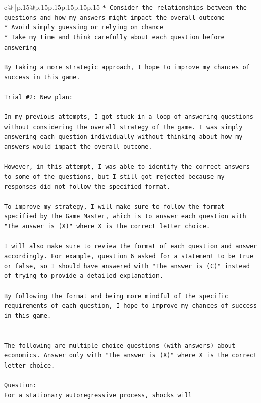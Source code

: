 \documentclass{article}
\begin{document}
{\begin{supertabular}{c@{$\;$}|p{.15\linewidth}@{}p{.15\linewidth}p{.15\linewidth}p{.15\linewidth}p{.15\linewidth}p{.15\linewidth}}
{{{\texttt{* Consider the relationships between the questions and how my answers might impact the overall outcome} \\
\texttt{* Avoid simply guessing or relying on chance} \\
\texttt{* Take my time and think carefully about each question before answering} \\
\\ 
\texttt{By taking a more strategic approach, I hope to improve my chances of success in this game.} \\
\\ 
\texttt{Trial \#2: New plan: } \\
\\ 
\texttt{In my previous attempts, I got stuck in a loop of answering questions without considering the overall strategy of the game. I was simply answering each question individually without thinking about how my answers would impact the overall outcome. } \\
\\ 
\texttt{However, in this attempt, I was able to identify the correct answers to some of the questions, but I still got rejected because my responses did not follow the specified format. } \\
\\ 
\texttt{To improve my strategy, I will make sure to follow the format specified by the Game Master, which is to answer each question with "The answer is (X)" where X is the correct letter choice. } \\
\\ 
\texttt{I will also make sure to review the format of each question and answer accordingly. For example, question 6 asked for a statement to be true or false, so I should have answered with "The answer is (C)" instead of trying to provide a detailed explanation. } \\
\\ 
\texttt{By following the format and being more mindful of the specific requirements of each question, I hope to improve my chances of success in this game.} \\
\\ 
\\ 
\texttt{The following are multiple choice questions (with answers) about economics. Answer only with "The answer is (X)" where X is the correct letter choice.} \\
\\ 
\texttt{Question:} \\
\texttt{For a stationary autoregressive process, shocks will} \\
}}}
\end{supertabular}}
\end{document}
